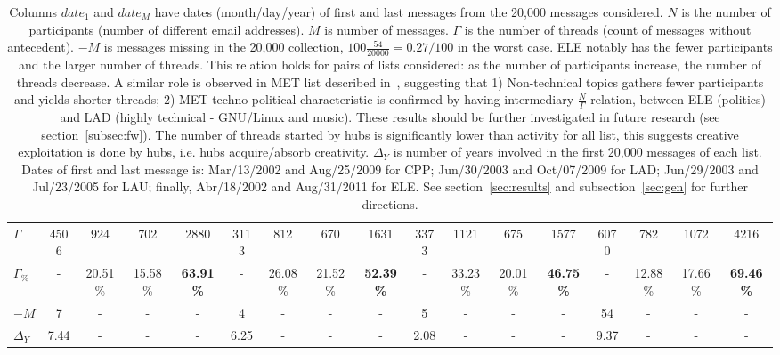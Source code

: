 \documentclass[%
 aip,
 jmp,%
 amsmath,amssymb,
 reprint,%
]{revtex4-1}
\begin{document}
\begin{table}
\begin{tabular}{|l|| c|c|c|c||  c|c|c|c||   c|c|c|c||   c|c|c|c|}
$\Gamma$  & 4506 & 924 & 702 & 2880 & 3113 & 812 & 670 & 1631 & 3373 & 1121 & 675 & 1577 & 6070 & 782 & 1072 & 4216 \\
$\Gamma_{\%}$  & - & 20.51\% & 15.58\% & {\bf 63.91\%} & - & 26.08\% & 21.52\% & {\bf 52.39\%} & - & 33.23\% & 20.01\% & {\bf 46.75\%} & - & 12.88\% & 17.66\% & {\bf 69.46\%} \\\hline\hline
$-M$               & 7     &-&-&-      & 4 &-&-&-          & 5 &-&-&-           & 54 &-&-&-   \\ \hline
$\Delta_Y$ & 7.44 & - & - & - &                                  6.25  & - & - & - & 2.08  & - & - & - &     9.37 & - & - & - \\ \hline 
  \end{tabular}
  \caption{Columns $date_1$ and $date_M$ have dates (month/day/year) of first and last messages from the 20,000 messages considered. $N$ is the number of participants (number of different email addresses). $M$ is number of messages. $\Gamma$ is the number of threads (count of messages without antecedent). $-M$ is messages missing in the 20,000 collection, $100\frac{54}{20000}=0.27/100$ in the worst case. ELE notably has the fewer participants and the larger number of threads. This relation holds for pairs of lists considered: as the number of participants increase, the number of threads decrease. A similar role is observed in MET list described in~\cite{evoSN}, suggesting that 1) Non-technical topics gathers fewer participants and yields shorter threads; 2) MET techno-political characteristic is confirmed by having intermediary $\frac{N}{\Gamma}$ relation, between ELE (politics) and LAD (highly technical - GNU/Linux and music). These results should be further investigated in future research (see section~\ref{subsec:fw}). The number of threads started by hubs is significantly lower than activity for all list, this suggests creative exploitation is done by hubs, i.e. hubs acquire/absorb creativity. $\Delta_Y$ is number of years involved in the first 20,000 messages of each list. Dates of first and last message is: Mar/13/2002 and Aug/25/2009 for CPP; Jun/30/2003 and Oct/07/2009 for LAD; Jun/29/2003 and Jul/23/2005 for LAU; finally, Abr/18/2002 and Aug/31/2011 for ELE. See section~\ref{sec:results} and subsection~\ref{sec:gen} for further directions.}
  \label{geralListas}\label{tab:bas}
\end{table}
\end{document}
